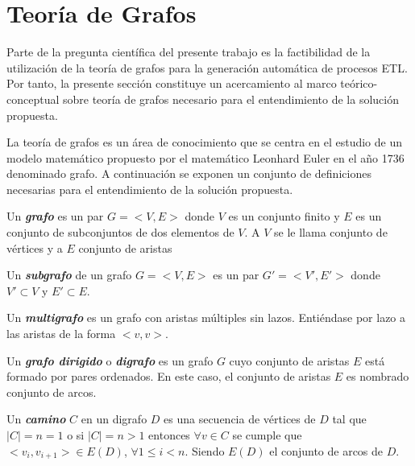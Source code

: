 \section{Teor\'ia de Grafos}\label{section:graphs}

Parte de la pregunta cient\'ifica del presente trabajo es la factibilidad de la utilización de la teoría de 
grafos para la generación automática de procesos ETL. Por tanto, la presente secci\'on constituye un acercamiento 
al marco te\'orico-conceptual sobre teoría de grafos necesario para el entendimiento de la solución propuesta.

La teoría de grafos es un \'area de conocimiento que se centra en el estudio de un modelo matemático 
propuesto por el matemático Leonhard Euler en el año 1736 denominado grafo\cite{estrada2012structure}. A continuaci\'on 
se exponen un conjunto de definiciones necesarias para el entendimiento de la solución propuesta.

\begin{definition}
    Un \textbf{\textit{grafo}} es un par $G = <V, E>$ donde $V$ es un conjunto finito y $E$ es un 
    conjunto de subconjuntos de dos elementos de $V$. A $V$ se le llama conjunto de v\'ertices y 
    a $E$ conjunto de aristas
\end{definition}

\begin{definition}
    Un \textbf{\textit{subgrafo}} de un grafo $G=<V,E>$ es un par $G'=<V',E'>$ donde $V' \subset V$ y 
    $E' \subset E$.
\end{definition}

\begin{definition}
    Un \textbf{\textit{multigrafo}} es un grafo con aristas m\'ultiples sin lazos. Entiéndase por 
    lazo a las aristas de la forma $<v,v>$.
\end{definition}

\begin{definition}
    Un \textbf{\textit{grafo dirigido}} o \textbf{\textit{digrafo}} es un grafo $G$ cuyo conjunto de 
    aristas $E$ est\'a formado por pares ordenados. En este caso, el conjunto de aristas $E$ es nombrado 
    conjunto de arcos.
\end{definition}

\begin{definition}
    Un \textbf{\textit{camino}} $C$ en un digrafo $D$ es una secuencia de v\'ertices de $D$ tal que $|C| = n = 1$ 
    o si $|C| = n > 1$ entonces $\forall v \in C$ se cumple que $<v_i , v_{i+1}> \in E(D)$, $\forall 1 \leq i < n$.
    Siendo $E(D)$ el conjunto de arcos de $D$.  
\end{definition}

